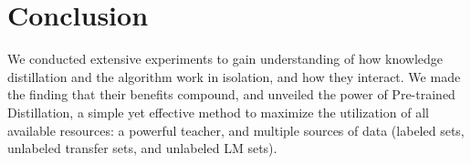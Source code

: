 \section{Conclusion}
We conducted extensive experiments to gain understanding of how knowledge distillation and the \ptft algorithm work in isolation, and how they interact. We made the finding that their benefits compound, and unveiled the power of Pre-trained Distillation, a simple yet effective method to maximize the utilization of all available resources: a powerful teacher, and multiple sources of data (labeled sets, unlabeled transfer sets, and unlabeled LM sets).
